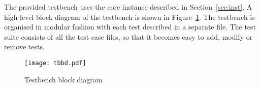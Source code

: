 The provided testbench uses the core instance described in
Section~\ref{sec:inst}. A high level block diagram of the testbench is shown in
Figure~\ref{fig:tbbd}. The testbench is organised in modular fashion with each
test described in a separate file. The test suite consists of all the test case
files, so that it becomes easy to add, modify or remove tests.



\begin{figure}[!htbp]
    \centerline{\texttt{[image: tbbd.pdf]}}
    \vspace{0cm}\caption{Testbench block diagram}
    \label{fig:tbbd}
\end{figure}


